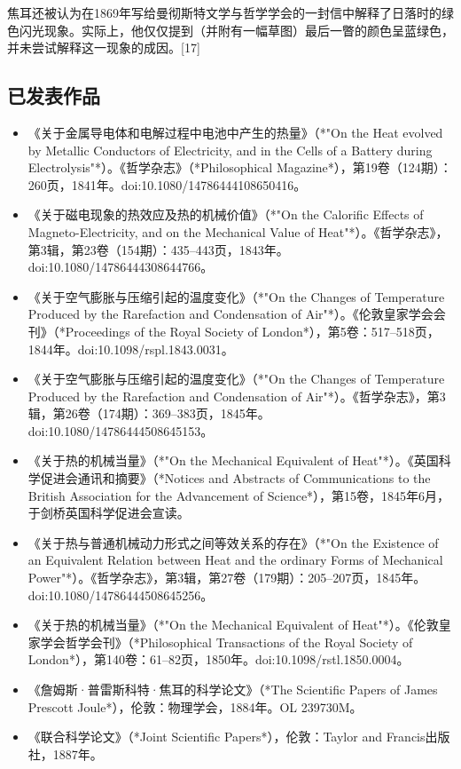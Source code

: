 焦耳还被认为在1869年写给曼彻斯特文学与哲学学会的一封信中解释了日落时的绿色闪光现象。实际上，他仅仅提到（并附有一幅草图）最后一瞥的颜色呈蓝绿色，并未尝试解释这一现象的成因。[17]

\subsection{已发表作品}

\begin{itemize}
\item 《关于金属导电体和电解过程中电池中产生的热量》（*"On the Heat evolved by Metallic Conductors of Electricity, and in the Cells of a Battery during Electrolysis"*）。《哲学杂志》（*Philosophical Magazine*），第19卷（124期）：260页，1841年。doi:10.1080/14786444108650416。  
\item 《关于磁电现象的热效应及热的机械价值》（*"On the Calorific Effects of Magneto-Electricity, and on the Mechanical Value of Heat"*）。《哲学杂志》，第3辑，第23卷（154期）：435–443页，1843年。doi:10.1080/14786444308644766。  
\item 《关于空气膨胀与压缩引起的温度变化》（*"On the Changes of Temperature Produced by the Rarefaction and Condensation of Air"*）。《伦敦皇家学会会刊》（*Proceedings of the Royal Society of London*），第5卷：517–518页，1844年。doi:10.1098/rspl.1843.0031。  
\item 《关于空气膨胀与压缩引起的温度变化》（*"On the Changes of Temperature Produced by the Rarefaction and Condensation of Air"*）。《哲学杂志》，第3辑，第26卷（174期）：369–383页，1845年。doi:10.1080/14786444508645153。  
\item 《关于热的机械当量》（*"On the Mechanical Equivalent of Heat"*）。《英国科学促进会通讯和摘要》（*Notices and Abstracts of Communications to the British Association for the Advancement of Science*），第15卷，1845年6月，于剑桥英国科学促进会宣读。  
\item 《关于热与普通机械动力形式之间等效关系的存在》（*"On the Existence of an Equivalent Relation between Heat and the ordinary Forms of Mechanical Power"*）。《哲学杂志》，第3辑，第27卷（179期）：205–207页，1845年。doi:10.1080/14786444508645256。  
\item 《关于热的机械当量》（*"On the Mechanical Equivalent of Heat"*）。《伦敦皇家学会哲学会刊》（*Philosophical Transactions of the Royal Society of London*），第140卷：61–82页，1850年。doi:10.1098/rstl.1850.0004。  
\item 《詹姆斯·普雷斯科特·焦耳的科学论文》（*The Scientific Papers of James Prescott Joule*），伦敦：物理学会，1884年。OL 239730M。  
\item 《联合科学论文》（*Joint Scientific Papers*），伦敦：Taylor and Francis出版社，1887年。  
\end{itemize}